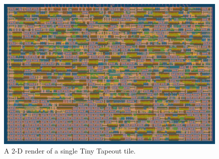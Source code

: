 \begin{figure}[!t]
\centering
\includegraphics[width=\columnwidth]{./Figs/gh action gds layout.png}
\caption{A 2-D render of a single Tiny Tapeout tile.}
\label{fig:render_cells_in_use}
\end{figure}
